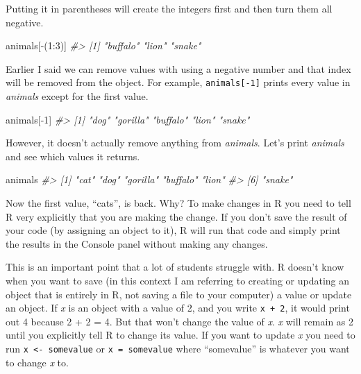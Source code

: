 \documentclass[
]{krantz}
\makeatletter
\newenvironment{Shaded}{\begin{snugshade}}{\end{snugshade}}
\newcommand{\CommentTok}[1]{\textcolor[rgb]{0.37,0.37,0.37}{\textit{#1}}}
\newcommand{\DecValTok}[1]{\textcolor[rgb]{0.06,0.06,0.06}{#1}}
\newcommand{\NormalTok}[1]{#1}
\newcommand{\SpecialCharTok}[1]{\textcolor[rgb]{0,0,0}{#1}}
\newenvironment{kframe}{%
\medskip{}
\setlength{\fboxsep}{.8em}
 \def\at@end@of@kframe{}%
 \ifinner\ifhmode%
  \def\at@end@of@kframe{\end{minipage}}%
  \begin{minipage}{\columnwidth}%
 \fi\fi%
 \def\FrameCommand##1{\hskip\@totalleftmargin \hskip-\fboxsep
 \colorbox{shadecolor}{##1}\hskip-\fboxsep
     \hskip-\linewidth \hskip-\@totalleftmargin \hskip\columnwidth}%
 \MakeFramed {\advance\hsize-\width
   \@totalleftmargin\z@ \linewidth\hsize
   \@setminipage}}%
 {\par\unskip\endMakeFramed%
 \at@end@of@kframe}
\renewenvironment{Shaded}{\begin{kframe}}{\end{kframe}}
\makeatother
\begin{document}
Putting it in parentheses will create the integers first and
then turn them all negative.

\begin{Shaded}
\begin{Highlighting}[]
\NormalTok{animals[}\SpecialCharTok{{-}}\NormalTok{(}\DecValTok{1}\SpecialCharTok{:}\DecValTok{3}\NormalTok{)]}
\CommentTok{\#\textgreater{} [1] "buffalo" "lion"    "snake"}
\end{Highlighting}
\end{Shaded}

Earlier I said we can remove values with using a negative
number and that index will be removed from the object. For
example, \texttt{animals{[}-1{]}} prints every value in
\emph{animals} except for the first value.

\begin{Shaded}
\begin{Highlighting}[]
\NormalTok{animals[}\SpecialCharTok{{-}}\DecValTok{1}\NormalTok{]}
\CommentTok{\#\textgreater{} [1] "dog"     "gorilla" "buffalo" "lion"    "snake"}
\end{Highlighting}
\end{Shaded}

However, it doesn't actually remove anything from
\emph{animals}. Let's print \emph{animals} and see which
values it returns.

\begin{Shaded}
\begin{Highlighting}[]
\NormalTok{animals}
\CommentTok{\#\textgreater{} [1] "cat"     "dog"     "gorilla" "buffalo" "lion"   }
\CommentTok{\#\textgreater{} [6] "snake"}
\end{Highlighting}
\end{Shaded}

Now the first value, ``cats'', is back. Why? To make changes
in R you need to tell R very explicitly that you are making
the change. If you don't save the result of your code (by
assigning an object to it), R will run that code and simply
print the results in the Console panel without making any
changes.

This is an important point that a lot of students struggle
with. R doesn't know when you want to save (in this context
I am referring to creating or updating an object that is
entirely in R, not saving a file to your computer) a value
or update an object. If \emph{x} is an object with a value
of 2, and you write \texttt{x\ +\ 2}, it would print out 4
because 2 + 2 = 4. But that won't change the value of
\emph{x}. \emph{x} will remain as 2 until you explicitly
tell R to change its value. If you want to update \emph{x}
you need to run \texttt{x\ \textless{}-\ somevalue} or
\texttt{x\ =\ somevalue} where ``somevalue'' is whatever you
want to change \emph{x} to.
\end{document}

